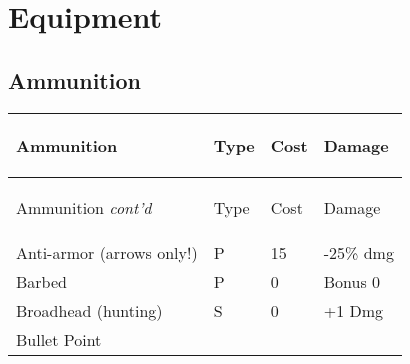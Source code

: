 \documentclass[twoside]{book}
\begin{document}
    

\chapter{Equipment}
    
    

\section{Ammunition}
    
\begin{longtable}{p{1.25in}lll} 
  Ammunition
  &
  \begin{turn}{70}{Type}\end{turn}
          
  &
  \begin{turn}{70}{Cost}\end{turn}
          
  &
  \begin{turn}{70}{Damage}\end{turn}
          
  \\
  \hline
  \hline
  \endfirsthead
  Ammunition \textit{cont'd}
        
  &
  \begin{turn}{70}{Type}\end{turn}
          
  &
  \begin{turn}{70}{Cost}\end{turn}
          
  &
  \begin{turn}{70}{Damage}\end{turn}
          
  \\
  \endhead
      
  \raggedright
           Anti-armor (arrows only!)
           
  &
   P 
  &
   15 
  &
   -25\% dmg 
  \tabularnewline
  \hline
      
  \raggedright
           Barbed 
  &
   P 
  &
   0 
  &
   Bonus 0 
  \tabularnewline
  \hline
      
  \raggedright
           Broadhead (hunting) 
  &
   S 
  &
   0 
  &
   +1 Dmg 
  \tabularnewline
  \hline
      
  \raggedright
           Bullet Point 
  &
  
  &
  
  &
  

\end{longtable}
\end{document}
